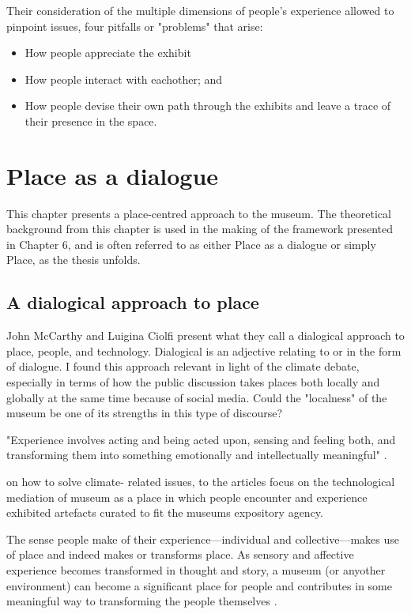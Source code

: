 Their consideration of the multiple dimensions of people's experience allowed to pinpoint issues, four pitfalls or "problems" that arise:
\begin{itemize}
    \item How people appreciate the exhibit
    \item How people interact with eachother; and
    \item How people devise their own path through the exhibits and leave a trace of their presence in the space.
\end{itemize}


\section{Place as a dialogue}
This chapter presents a place-centred approach to the museum. The theoretical background from this chapter is used in the making of the framework presented in Chapter 6, and is often referred to as either Place as a dialogue or simply Place, as the thesis unfolds. 

\subsection{A dialogical approach to place}
John McCarthy and Luigina Ciolfi present what they call a dialogical approach to place, people, and technology. Dialogical is an adjective relating to or in the form of dialogue. I found this approach relevant in light of the climate debate, especially in terms of how the public discussion takes places both locally and globally at the same time because of social media. Could the "localness"  of the museum be one of its strengths in this type of discourse? 

 "Experience involves acting and being acted upon, sensing and feeling both, and transforming them into something emotionally and intellectually meaningful" \autocite[p. 250]{mccarthy_place}. 


on how to solve climate- related issues, to the articles focus on the technological mediation of museum as a place in which people encounter and experience exhibited artefacts curated to fit the museums expository agency.

The sense people make of their experience—individual and collective—makes use of place and indeed makes or transforms place. As sensory and affective experience becomes transformed in thought and story, a museum (or anyother environment) can become a significant place for people and contributes in some meaningful way to transforming the people themselves \autocite[p. 250]{mccarthy_place}.

